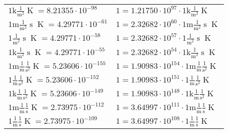 \begin{center}
\begin{longtable}{l l}
{\color{gray}$1 \bm{\mathrm{ k}}\frac1{\operatorname{m}^2}{}{}{\operatorname{K}} = 8.21355\cdot10^{-98} $}   & {\color{gray}$ 1 = 1.21750\cdot10^{97} \cdot 1 \bm{\mathrm{ k}}\frac1{\operatorname{m}^2}{}{}{\operatorname{K}}$}  \\
{\color{gray}$1 \bm{\mathrm{ m}}\frac1{\operatorname{m}^2}{\operatorname{s}}{}{\operatorname{K}} = 4.29771\cdot10^{-61} $}   & {\color{gray}$ 1 = 2.32682\cdot10^{60} \cdot 1 \bm{\mathrm{ m}}\frac1{\operatorname{m}^2}{\operatorname{s}}{}{\operatorname{K}}$}  \\
{\color{black}$1 \bm{\mathrm{ }}\frac1{\operatorname{m}^2}{\operatorname{s}}{}{\operatorname{K}} = 4.29771\cdot10^{-58} $}   & {\color{black}$ 1 = 2.32682\cdot10^{57} \cdot 1 \bm{\mathrm{ }}\frac1{\operatorname{m}^2}{\operatorname{s}}{}{\operatorname{K}}$}  \\
{\color{gray}$1 \bm{\mathrm{ k}}\frac1{\operatorname{m}^2}{\operatorname{s}}{}{\operatorname{K}} = 4.29771\cdot10^{-55} $}   & {\color{gray}$ 1 = 2.32682\cdot10^{54} \cdot 1 \bm{\mathrm{ k}}\frac1{\operatorname{m}^2}{\operatorname{s}}{}{\operatorname{K}}$}  \\
{\color{gray}$1 \bm{\mathrm{ m}}\frac1{\operatorname{m}}\frac1{\operatorname{s}^2}{}{\operatorname{K}} = 5.23606\cdot10^{-155} $}   & {\color{gray}$ 1 = 1.90983\cdot10^{154} \cdot 1 \bm{\mathrm{ m}}\frac1{\operatorname{m}}\frac1{\operatorname{s}^2}{}{\operatorname{K}}$}  \\
{\color{black}$1 \bm{\mathrm{ }}\frac1{\operatorname{m}}\frac1{\operatorname{s}^2}{}{\operatorname{K}} = 5.23606\cdot10^{-152} $}   & {\color{black}$ 1 = 1.90983\cdot10^{151} \cdot 1 \bm{\mathrm{ }}\frac1{\operatorname{m}}\frac1{\operatorname{s}^2}{}{\operatorname{K}}$}  \\
{\color{gray}$1 \bm{\mathrm{ k}}\frac1{\operatorname{m}}\frac1{\operatorname{s}^2}{}{\operatorname{K}} = 5.23606\cdot10^{-149} $}   & {\color{gray}$ 1 = 1.90983\cdot10^{148} \cdot 1 \bm{\mathrm{ k}}\frac1{\operatorname{m}}\frac1{\operatorname{s}^2}{}{\operatorname{K}}$}  \\
{\color{gray}$1 \bm{\mathrm{ m}}\frac1{\operatorname{m}}\frac1{\operatorname{s}}{}{\operatorname{K}} = 2.73975\cdot10^{-112} $}   & {\color{gray}$ 1 = 3.64997\cdot10^{111} \cdot 1 \bm{\mathrm{ m}}\frac1{\operatorname{m}}\frac1{\operatorname{s}}{}{\operatorname{K}}$}  \\
{\color{black}$1 \bm{\mathrm{ }}\frac1{\operatorname{m}}\frac1{\operatorname{s}}{}{\operatorname{K}} = 2.73975\cdot10^{-109} $}   & {\color{black}$ 1 = 3.64997\cdot10^{108} \cdot 1 \bm{\mathrm{ }}\frac1{\operatorname{m}}\frac1{\operatorname{s}}{}{\operatorname{K}}$}  \\

\end{longtable}
\end{center}
